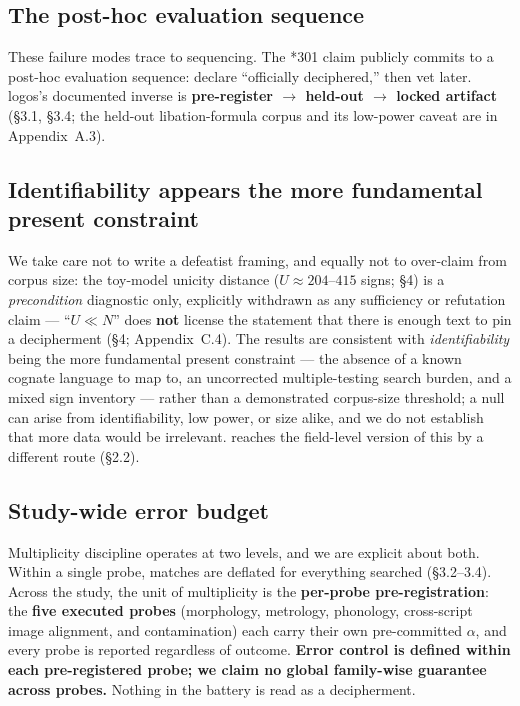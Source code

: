 \subsection{The post-hoc evaluation sequence}

These failure modes trace to sequencing. The *301 claim publicly commits to
a post-hoc evaluation sequence: declare ``officially deciphered,'' then vet
later. logos's documented inverse is \textbf{pre-register $\rightarrow$
held-out $\rightarrow$ locked artifact} (\S3.1, \S3.4; the held-out
libation-formula corpus and its low-power caveat are in Appendix~A.3).

\subsection{Identifiability appears the more fundamental present constraint}

We take care not to write a defeatist framing, and equally not to
over-claim from corpus size: the toy-model unicity distance
($U \approx 204$--$415$ signs; \S4) is a \emph{precondition} diagnostic
only, explicitly withdrawn as any sufficiency or refutation claim ---
``$U \ll N$'' does \textbf{not} license the statement that there is enough
text to pin a decipherment (\S4; Appendix~C.4). The
results are consistent with \emph{identifiability} being the more
fundamental present constraint --- the absence of a known cognate language
to map to, an uncorrected multiple-testing search burden, and a mixed sign
inventory --- rather than a demonstrated corpus-size threshold; a null can
arise from identifiability, low power, or size alike, and we do not
establish that more data would be irrelevant.
\citet[\S8]{salgarella2025}
reaches the field-level version of this by a different route (\S2.2).

\subsection{Study-wide error budget}

Multiplicity discipline operates at two levels, and we are explicit about
both. Within a single probe, matches are deflated for everything
searched (\S3.2--3.4). Across the study, the unit of multiplicity is the
\textbf{per-probe pre-registration}: the \textbf{five executed probes}
(morphology, metrology, phonology, cross-script image alignment, and
contamination) each carry their own pre-committed $\alpha$, and every probe
is reported regardless of outcome. \textbf{Error control is defined within
each pre-registered probe; we claim no global family-wise guarantee across
probes.} Nothing in the battery is read as a decipherment.

